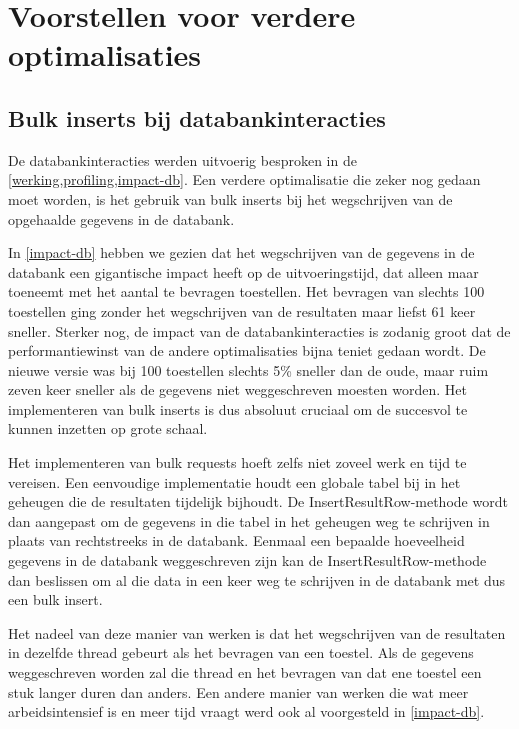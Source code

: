 \chapter{Voorstellen voor verdere optimalisaties}


\section{Bulk inserts bij databankinteracties}

De databankinteracties werden uitvoerig besproken in de \cref{werking,profiling,impact-db}.
Een verdere optimalisatie die zeker nog gedaan moet worden,
is het gebruik van bulk inserts bij het wegschrijven van de opgehaalde gegevens in de databank.

In \cref{impact-db} hebben we gezien dat het wegschrijven van de gegevens in de databank een gigantische impact heeft op de uitvoeringstijd,
dat alleen maar toeneemt met het aantal te bevragen toestellen.
Het bevragen van slechts 100 toestellen ging zonder het wegschrijven van de resultaten maar liefst 61 keer sneller.
Sterker nog, de impact van de databankinteracties is zodanig groot dat de performantiewinst van de andere optimalisaties bijna teniet gedaan wordt.
De nieuwe versie was bij 100 toestellen slechts 5\% sneller dan de oude, maar ruim zeven keer sneller als de gegevens niet weggeschreven moesten worden.
Het implementeren van bulk inserts is dus absoluut cruciaal om de \nwmretriever{} succesvol te kunnen inzetten op grote schaal.

Het implementeren van bulk requests hoeft zelfs niet zoveel werk en tijd te vereisen.
Een eenvoudige implementatie houdt een globale tabel bij in het geheugen die de resultaten tijdelijk bijhoudt.
De InsertResultRow-methode wordt dan aangepast om de gegevens in die tabel in het geheugen weg te schrijven in plaats van rechtstreeks in de databank.
Eenmaal een bepaalde hoeveelheid gegevens in de databank weggeschreven zijn kan de InsertResultRow-methode dan beslissen om al die data
in een keer weg te schrijven in de databank met dus een bulk insert.

Het nadeel van deze manier van werken is dat het wegschrijven van de resultaten in dezelfde thread gebeurt als het bevragen van een toestel.
Als de gegevens weggeschreven worden zal die thread en het bevragen van dat ene toestel een stuk langer duren dan anders.
Een andere manier van werken die wat meer arbeidsintensief is en meer tijd vraagt werd ook al voorgesteld in \cref{impact-db}.

